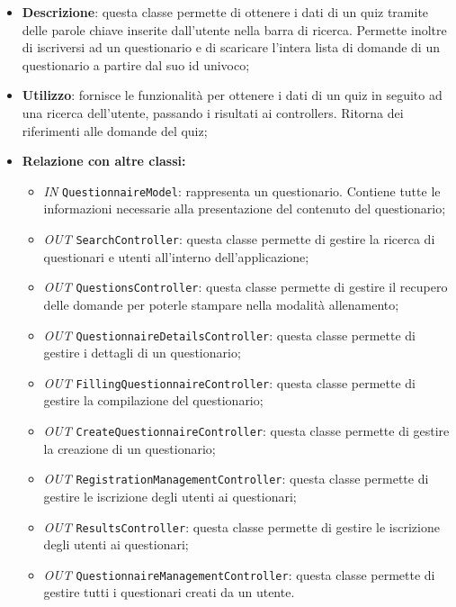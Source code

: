 \begin{itemize}
	\item \textbf{Descrizione}: questa classe permette di ottenere i dati di un quiz tramite delle parole chiave inserite dall'utente nella barra di ricerca. Permette inoltre di iscriversi ad un questionario e di scaricare l'intera lista di domande di un questionario a partire dal suo id univoco;
	\item \textbf{Utilizzo}: fornisce le funzionalità per ottenere i dati di un quiz in seguito ad una ricerca dell'utente, passando i risultati ai controllers. Ritorna dei riferimenti alle domande del quiz;
	\item \textbf{Relazione con altre classi:}
	\begin{itemize}
		\item \textit{IN} \texttt{QuestionnaireModel}: rappresenta un questionario. Contiene tutte le informazioni necessarie alla
		presentazione del contenuto del questionario; 
		\item \textit{OUT} \texttt{SearchController}: questa classe permette di gestire la ricerca di questionari e utenti all'interno dell'applicazione;
		\item \textit{OUT} \texttt{QuestionsController}: questa classe permette di gestire il recupero delle domande per poterle stampare nella modalità allenamento;
		\item \textit{OUT} \texttt{QuestionnaireDetailsController}: questa classe permette di gestire i dettagli di un questionario;
		\item \textit{OUT} \texttt{FillingQuestionnaireController}: questa classe permette di gestire la compilazione del questionario;
		\item \textit{OUT} \texttt{CreateQuestionnaireController}: questa classe permette di gestire la creazione di un questionario;
		\item \textit{OUT} \texttt{RegistrationManagementController}: questa classe permette di gestire le iscrizione degli utenti ai questionari;
		\item \textit{OUT} \texttt{ResultsController}: questa classe permette di gestire le iscrizione degli utenti ai questionari; 
		\item \textit{OUT} \texttt{QuestionnaireManagementController}: questa classe permette di gestire tutti i questionari creati da un utente. 
		

\end{itemize}
\end{itemize}
